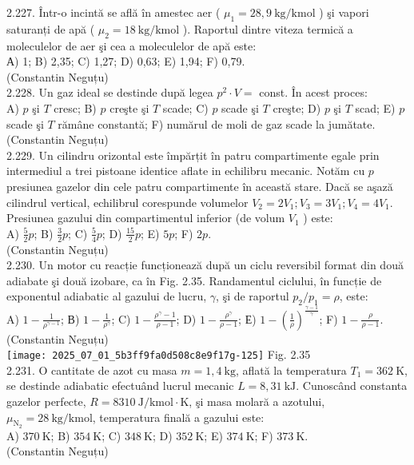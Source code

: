 2.227. Într-o incintă se află în amestec aer ( $\mu_{1}=28,9 \mathrm{~kg} / \mathrm{kmol}$ ) şi vapori saturanți de apă ( $\mu_{2}=18 \mathrm{~kg} / \mathrm{kmol}$ ). Raportul dintre viteza termică a moleculelor de aer şi cea a moleculelor de apă este:\\ А) 1; B) 2,35; C) 1,27; D) 0,63; E) 1,94; F) 0,79.\\ (Constantin Neguțu)\\

2.228. Un gaz ideal se destinde după legea $p^{2} \cdot V=$ const. În acest proces:\\ A) $p$ şi $T$ cresc; B) $p$ creşte şi $T$ scade; C) $p$ scade şi $T$ creşte; D) $p$ şi $T$ scad; E) $p$ scade şi $T$ rămâne constantă; F) numărul de moli de gaz scade la jumătate.\\ (Constantin Neguțu)\\

2.229. Un cilindru orizontal este împărțit în patru compartimente egale prin intermediul a trei pistoane identice aflate in echilibru mecanic. Notăm cu $p$ presiunea gazelor din cele patru compartimente în această stare. Dacă se aşază cilindrul vertical, echilibrul corespunde volumelor $V_{2}=2 V_{1} ; V_{3}=3 V_{1} ; V_{4}=4 V_{1}$. Presiunea gazului din compartimentul inferior (de volum $V_{1}$ ) este:\\ A) $\frac{5}{2} p$; B) $\frac{3}{2} p$; C) $\frac{5}{4} p$; D) $\frac{15}{2} p$; E) $5 p$; F) $2 p$.\\ (Constantin Neguțu)\\

2.230. Un motor cu reacție funcționează după un ciclu reversibil format din două adiabate şi două izobare, ca în Fig. 2.35. Randamentul ciclului, în funcție de exponentul adiabatic al gazului de lucru, $\gamma$, şi de raportul $p_{2} / p_{1}=\rho$, este:\\ A) $1-\frac{1}{\rho^{\gamma-1}}$; В) $1-\frac{1}{\rho^{\gamma}}$; C) $1-\frac{\rho^{\gamma}-1}{\rho-1}$; D) $1-\frac{\rho^{\gamma}}{\rho-1}$; Е) $1-\left(\frac{1}{\rho}\right)^{\frac{\gamma-1}{\gamma}}$; F) $1-\frac{\rho}{\rho-1}$.\\ (Constantin Neguțu)\\ \texttt{[image: 2025\_07\_01\_5b3ff9fa0d508c8e9f17g-125]} Fig. 2.35\\

2.231. O cantitate de azot cu masa $m=1,4 \mathrm{~kg}$, aflată la temperatura $T_{1}=362 \mathrm{~K}$, se destinde adiabatic efectuând lucrul mecanic $L=8,31 \mathrm{~kJ}$. Cunoscând constanta gazelor perfecte, $R=8310 \mathrm{~J} / \mathrm{kmol} \cdot \mathrm{K}$, şi masa molară a azotului, $\mu_{\mathrm{N}_{2}}=28 \mathrm{~kg} / \mathrm{kmol}$, temperatura finală a gazului este:\\ A) $370 \mathrm{~K}$; B) $354 \mathrm{~K}$; C) $348 \mathrm{~K}$; D) $352 \mathrm{~K}$; E) $374 \mathrm{~K}$; F) $373 \mathrm{~K}$.\\ (Constantin Neguțu)\\

